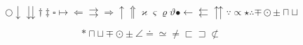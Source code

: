 
\begin{equation}
\bigcirc\downarrow\downdownarrows\dagger\ddagger\square\mapsto\Leftarrow\rightrightarrows\Rightarrow\uparrow\Uparrow\varkappa\varsigma\varrho\vartheta\bullet\leftarrow\leftleftarrows\upuparrows\because\propto\star\therefore\mp\odot\pm\sqcap\sqcup
\end{equation}

\begin{equation}
\ast\sqcap\sqcup\mp\odot\pm\angle\doteq\simeq\ne\sqsubset\sqsupset\nsubset
\end{equation}
